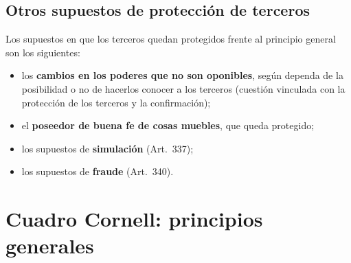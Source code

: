 \documentclass[12pt,oneside]{book}
\begin{document}
\subsection{Otros supuestos de protección de terceros}

Los supuestos en que los terceros quedan protegidos frente al principio general son los siguientes:

\begin{itemize}
    \item los \textbf{cambios en los poderes que no son oponibles}, según dependa de la posibilidad o no de hacerlos conocer a los terceros (cuestión vinculada con la protección de los terceros y la confirmación);
    \item el \textbf{poseedor de buena fe de cosas muebles}, que queda protegido;
    \item los supuestos de \textbf{simulación} (Art.~337);
    \item los supuestos de \textbf{fraude} (Art.~340).
\end{itemize}

\section{Cuadro Cornell: principios generales}
\end{document}
